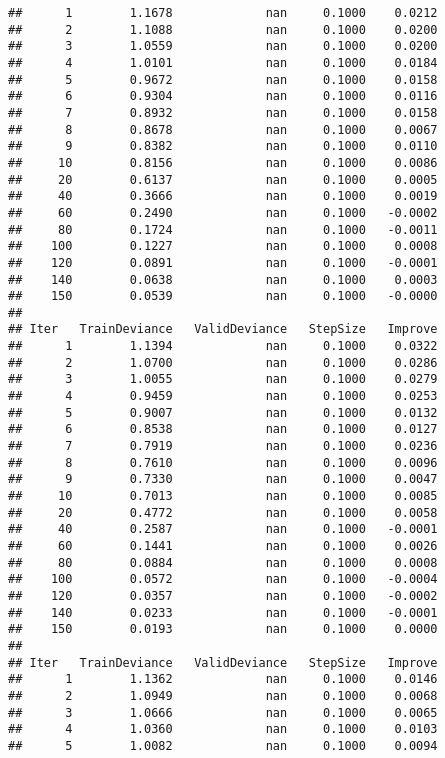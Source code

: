 \documentclass[]{article}
\begin{document}
\begin{verbatim}
##      1        1.1678             nan     0.1000    0.0212
##      2        1.1088             nan     0.1000    0.0200
##      3        1.0559             nan     0.1000    0.0200
##      4        1.0101             nan     0.1000    0.0184
##      5        0.9672             nan     0.1000    0.0158
##      6        0.9304             nan     0.1000    0.0116
##      7        0.8932             nan     0.1000    0.0158
##      8        0.8678             nan     0.1000    0.0067
##      9        0.8382             nan     0.1000    0.0110
##     10        0.8156             nan     0.1000    0.0086
##     20        0.6137             nan     0.1000    0.0005
##     40        0.3666             nan     0.1000    0.0019
##     60        0.2490             nan     0.1000   -0.0002
##     80        0.1724             nan     0.1000   -0.0011
##    100        0.1227             nan     0.1000    0.0008
##    120        0.0891             nan     0.1000   -0.0001
##    140        0.0638             nan     0.1000    0.0003
##    150        0.0539             nan     0.1000   -0.0000
## 
## Iter   TrainDeviance   ValidDeviance   StepSize   Improve
##      1        1.1394             nan     0.1000    0.0322
##      2        1.0700             nan     0.1000    0.0286
##      3        1.0055             nan     0.1000    0.0279
##      4        0.9459             nan     0.1000    0.0253
##      5        0.9007             nan     0.1000    0.0132
##      6        0.8538             nan     0.1000    0.0127
##      7        0.7919             nan     0.1000    0.0236
##      8        0.7610             nan     0.1000    0.0096
##      9        0.7330             nan     0.1000    0.0047
##     10        0.7013             nan     0.1000    0.0085
##     20        0.4772             nan     0.1000    0.0058
##     40        0.2587             nan     0.1000   -0.0001
##     60        0.1441             nan     0.1000    0.0026
##     80        0.0884             nan     0.1000    0.0008
##    100        0.0572             nan     0.1000   -0.0004
##    120        0.0357             nan     0.1000   -0.0002
##    140        0.0233             nan     0.1000   -0.0001
##    150        0.0193             nan     0.1000    0.0000
## 
## Iter   TrainDeviance   ValidDeviance   StepSize   Improve
##      1        1.1362             nan     0.1000    0.0146
##      2        1.0949             nan     0.1000    0.0068
##      3        1.0666             nan     0.1000    0.0065
##      4        1.0360             nan     0.1000    0.0103
##      5        1.0082             nan     0.1000    0.0094

\end{verbatim}
\end{document}
